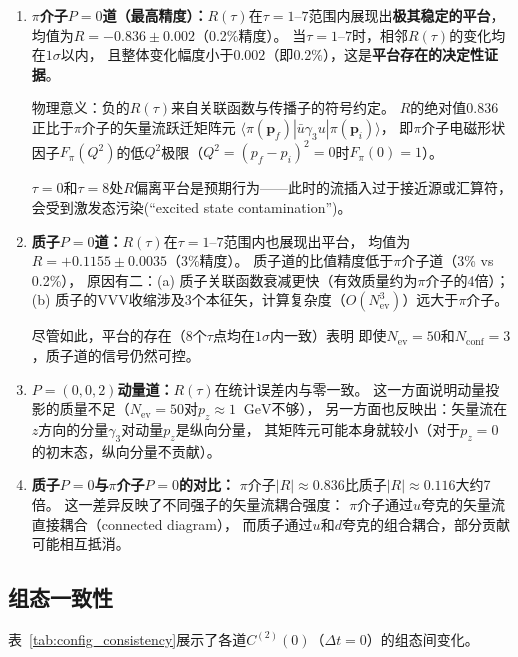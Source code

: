 \documentclass[11pt,a4paper]{article}
\newcommand{\gev}{\;\mathrm{GeV}}
\newcommand{\Nconf}{N_{\mathrm{conf}}}
\newcommand{\Nev}{N_{\mathrm{ev}}}
\begin{document}
\begin{enumerate}[leftmargin=*]

\item \textbf{$\pi$介子$P=0$道（最高精度）：}$R(\tau)$在$\tau=1$--$7$范围内展现出\textbf{极其稳定的平台}，
均值为$R = -0.836 \pm 0.002$（0.2\%精度）。
当$\tau=1$--$7$时，相邻$R(\tau)$的变化均在$1\sigma$以内，
且整体变化幅度小于$0.002$（即$0.2\%$），这是\textbf{平台存在的决定性证据}。

物理意义：负的$R(\tau)$来自关联函数与传播子的符号约定。
$R$的绝对值$0.836$正比于$\pi$介子的矢量流跃迁矩阵元
$\langle \pi(\bm{p}_f) | \bar{u}\gamma_3 u | \pi(\bm{p}_i) \rangle$，
即$\pi$介子电磁形状因子$F_\pi(Q^2)$的低$Q^2$极限（$Q^2=(p_f-p_i)^2=0$时$F_\pi(0)=1$）。

$\tau=0$和$\tau=8$处$R$偏离平台是预期行为——此时的流插入过于接近源或汇算符，
会受到激发态污染(``excited state contamination'')。

\item \textbf{质子$P=0$道：}$R(\tau)$在$\tau=1$--$7$范围内也展现出平台，
均值为$R = +0.1155 \pm 0.0035$（3\%精度）。
质子道的比值精度低于$\pi$介子道（3\% vs 0.2\%），
原因有二：(a) 质子关联函数衰减更快（有效质量约为$\pi$介子的4倍）；
(b) 质子的VVV收缩涉及3个本征矢，计算复杂度（$O(\Nev^3)$）远大于$\pi$介子。

尽管如此，平台的存在（8个$\tau$点均在$1\sigma$内一致）表明
即使$\Nev=50$和$\Nconf=3$，质子道的信号仍然可控。

\item \textbf{$P=(0,0,2)$动量道：}$R(\tau)$在统计误差内与零一致。
这一方面说明动量投影的质量不足（$\Nev=50$对$p_z\approx 1\;\gev$不够），
另一方面也反映出：矢量流在$z$方向的分量$\gamma_3$对动量$p_z$是纵向分量，
其矩阵元可能本身就较小（对于$p_z=0$的初末态，纵向分量不贡献）。

\item \textbf{质子$P=0$与$\pi$介子$P=0$的对比：}
$\pi$介子$|R|\approx 0.836$比质子$|R|\approx 0.116$大约7倍。
这一差异反映了不同强子的矢量流耦合强度：
$\pi$介子通过$u$夸克的矢量流直接耦合（connected diagram），
而质子通过$u$和$d$夸克的组合耦合，部分贡献可能相互抵消。

\end{enumerate}

\subsection{组态一致性}

表~\ref{tab:config_consistency}展示了各道$C^{(2)}(0)$（$\Delta t=0$）的组态间变化。
\end{document}
